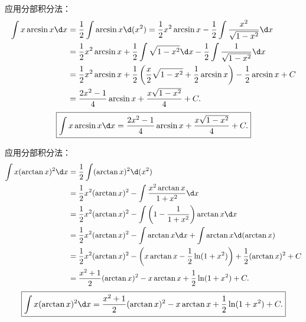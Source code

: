 \begin{solution}

    应用分部积分法：
    \begin{equation}
        \begin{aligned}
            \int x \arcsin x \d x & = \frac{1}{2}\int \arcsin x \d(x^2) = \frac{1}{2}x^2 \arcsin x - \frac{1}{2}\int \frac{x^2}{\sqrt{1 - x^2}} \d x                   \\
                                  & = \frac{1}{2}x^2 \arcsin x + \frac{1}{2}\int \sqrt{1 - x^2} \d x - \frac{1}{2}\int \frac{1}{\sqrt{1 - x^2}} \d x                   \\
                                  & = \frac{1}{2}x^2 \arcsin x + \frac{1}{2}\left( \frac{x}{2}\sqrt{1 - x^2} + \frac{1}{2}\arcsin x \right) - \frac{1}{2}\arcsin x + C \\
                                  & = \frac{2x^2 - 1}{4}\arcsin x + \frac{x\sqrt{1 - x^2}}{4} + C.
        \end{aligned}
    \end{equation}
    \begin{equation}
        \boxed{\int x \arcsin x \d x = \frac{2x^2 - 1}{4}\arcsin x + \frac{x\sqrt{1 - x^2}}{4} + C.}
    \end{equation}


    应用分部积分法：
    \begin{equation}
        \begin{aligned}
            \int x(\arctan x)^2 \d x & = \frac{1}{2}\int (\arctan x)^2 \d(x^2)                                                                             \\
                                     & = \frac{1}{2}x^2 (\arctan x)^2 - \int \frac{x^2 \arctan x}{1 + x^2} \d x                                            \\
                                     & = \frac{1}{2}x^2 (\arctan x)^2 - \int \left( 1 - \frac{1}{1 + x^2} \right)\arctan x \d x                            \\
                                     & = \frac{1}{2}x^2 (\arctan x)^2 - \int \arctan x \d x + \int \arctan x \d(\arctan x)                                 \\
                                     & = \frac{1}{2}x^2 (\arctan x)^2 - \left( x\arctan x - \frac{1}{2}\ln(1 + x^2) \right) + \frac{1}{2}(\arctan x)^2 + C \\
                                     & = \frac{x^2 + 1}{2}(\arctan x)^2 - x\arctan x + \frac{1}{2}\ln(1 + x^2) + C.
        \end{aligned}
    \end{equation}
    \begin{equation}
        \boxed{\int x(\arctan x)^2 \d x = \frac{x^2 + 1}{2}(\arctan x)^2 - x\arctan x + \frac{1}{2}\ln(1 + x^2) + C.}
    \end{equation}


\end{solution}
